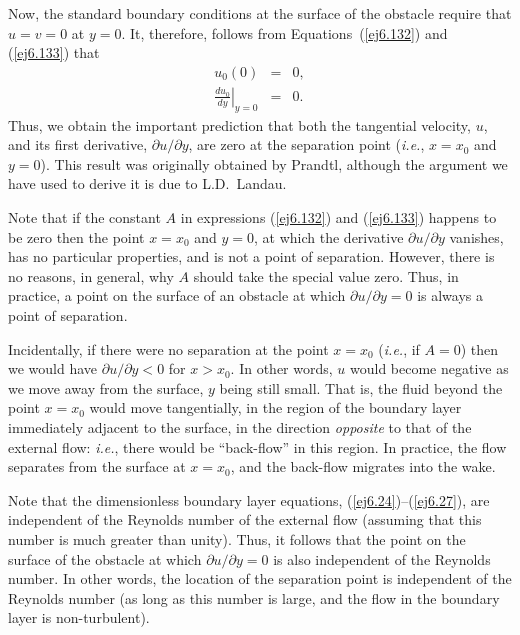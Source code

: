 Now, the standard boundary conditions at the surface of the obstacle require
that $u=v=0$ at $y=0$. It, therefore, follows from Equations~(\ref{ej6.132}) and (\ref{ej6.133}) that
\begin{eqnarray}
u_0(0) &=& 0,\\[0.5ex]
\left.\frac{du_0}{dy}\right|_{y=0}& =& 0.
\end{eqnarray}
Thus, we obtain the important prediction that  both the
tangential velocity, $u$, and its first derivative, $\partial u/\partial y$,  are zero at the separation point ({\em i.e.}, $x=x_0$ and $y=0$). This result was originally
obtained by Prandtl, although the argument we have used to derive it is due to L.D.~Landau. 

Note that if the constant $A$ in expressions (\ref{ej6.132}) and (\ref{ej6.133}) happens to be
zero then the point $x=x_0$ and $y=0$, at which the derivative $\partial u/\partial y$ vanishes, 
has no particular properties, and is not a point of separation. However,  there is no reasons, in
general, why $A$ should take the special value zero. Thus, in practice, a point on  the surface
of an obstacle at which $\partial u/\partial y=0$ is always a point of separation. 

Incidentally, if there were no separation at the point $x=x_0$ ({\em i.e.}, if $A=0$) then  we
would have $\partial u/\partial y<0$ for $x>x_0$. In other words, $u$ would become negative as we move
away from the surface, $y$ being still small. That is, the fluid beyond the point $x=x_0$
would move tangentially, in the region of the boundary layer immediately adjacent to the surface, in the
direction {\em opposite}\/ to that of the external flow: {\em i.e.}, there would be  ``back-flow'' in this region. 
In practice, the flow separates from the surface at $x=x_0$, and the back-flow migrates into the wake. 

Note that the dimensionless boundary layer equations,  (\ref{ej6.24})--(\ref{ej6.27}),  are independent of the Reynolds
number of the external flow (assuming that this number is much greater than unity). Thus, it follows
that the point on the surface of the obstacle at which $\partial u/\partial y=0$ is also independent of the
Reynolds number. In other words, the location of the separation point is independent of the Reynolds
number (as long as this number is large, and the flow in the boundary layer is non-turbulent). 

